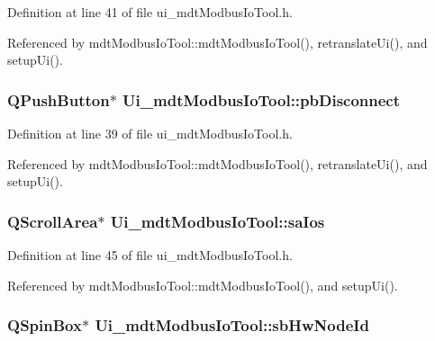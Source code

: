 Definition at line 41 of file ui\-\_\-mdt\-Modbus\-Io\-Tool.\-h.



Referenced by mdt\-Modbus\-Io\-Tool\-::mdt\-Modbus\-Io\-Tool(), retranslate\-Ui(), and setup\-Ui().

\hypertarget{class_ui__mdt_modbus_io_tool_ab2afd7755226736210df8078d253fd78}{
\subsubsection[{pb\-Disconnect}]{\setlength{\rightskip}{0pt plus 5cm}Q\-Push\-Button$\ast$ Ui\-\_\-mdt\-Modbus\-Io\-Tool\-::pb\-Disconnect}}\label{class_ui__mdt_modbus_io_tool_ab2afd7755226736210df8078d253fd78}


Definition at line 39 of file ui\-\_\-mdt\-Modbus\-Io\-Tool.\-h.



Referenced by mdt\-Modbus\-Io\-Tool\-::mdt\-Modbus\-Io\-Tool(), retranslate\-Ui(), and setup\-Ui().

\hypertarget{class_ui__mdt_modbus_io_tool_a0193061f662939b755bc31832269dd02}{
\subsubsection[{sa\-Ios}]{\setlength{\rightskip}{0pt plus 5cm}Q\-Scroll\-Area$\ast$ Ui\-\_\-mdt\-Modbus\-Io\-Tool\-::sa\-Ios}}\label{class_ui__mdt_modbus_io_tool_a0193061f662939b755bc31832269dd02}


Definition at line 45 of file ui\-\_\-mdt\-Modbus\-Io\-Tool.\-h.



Referenced by mdt\-Modbus\-Io\-Tool\-::mdt\-Modbus\-Io\-Tool(), and setup\-Ui().

\hypertarget{class_ui__mdt_modbus_io_tool_ac67713d504ef59d0fefa6da5ca05452c}{
\subsubsection[{sb\-Hw\-Node\-Id}]{\setlength{\rightskip}{0pt plus 5cm}Q\-Spin\-Box$\ast$ Ui\-\_\-mdt\-Modbus\-Io\-Tool\-::sb\-Hw\-Node\-Id}}\label{class_ui__mdt_modbus_io_tool_ac67713d504ef59d0fefa6da5ca05452c}


